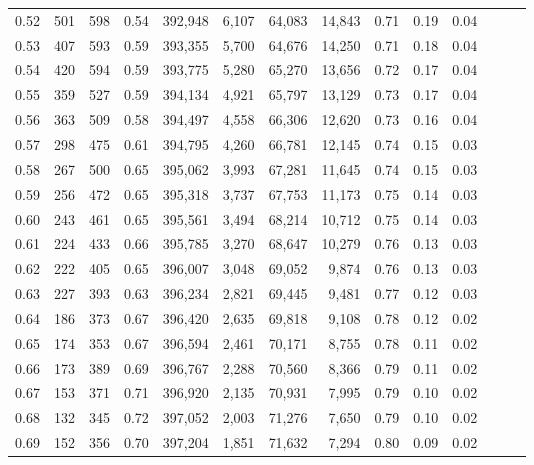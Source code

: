 \begin{tabular}{rrrrrrrrrrrrrr}
0.52 &     501 &    598 &  0.54 &  392,948 &    6,107 &  64,083 &  14,843 &  0.71 &  0.19 &      0.04 \\
0.53 &     407 &    593 &  0.59 &  393,355 &    5,700 &  64,676 &  14,250 &  0.71 &  0.18 &      0.04 \\
0.54 &     420 &    594 &  0.59 &  393,775 &    5,280 &  65,270 &  13,656 &  0.72 &  0.17 &      0.04 \\
0.55 &     359 &    527 &  0.59 &  394,134 &    4,921 &  65,797 &  13,129 &  0.73 &  0.17 &      0.04 \\
0.56 &     363 &    509 &  0.58 &  394,497 &    4,558 &  66,306 &  12,620 &  0.73 &  0.16 &      0.04 \\
0.57 &     298 &    475 &  0.61 &  394,795 &    4,260 &  66,781 &  12,145 &  0.74 &  0.15 &      0.03 \\
0.58 &     267 &    500 &  0.65 &  395,062 &    3,993 &  67,281 &  11,645 &  0.74 &  0.15 &      0.03 \\
0.59 &     256 &    472 &  0.65 &  395,318 &    3,737 &  67,753 &  11,173 &  0.75 &  0.14 &      0.03 \\
0.60 &     243 &    461 &  0.65 &  395,561 &    3,494 &  68,214 &  10,712 &  0.75 &  0.14 &      0.03 \\
0.61 &     224 &    433 &  0.66 &  395,785 &    3,270 &  68,647 &  10,279 &  0.76 &  0.13 &      0.03 \\
0.62 &     222 &    405 &  0.65 &  396,007 &    3,048 &  69,052 &   9,874 &  0.76 &  0.13 &      0.03 \\
0.63 &     227 &    393 &  0.63 &  396,234 &    2,821 &  69,445 &   9,481 &  0.77 &  0.12 &      0.03 \\
0.64 &     186 &    373 &  0.67 &  396,420 &    2,635 &  69,818 &   9,108 &  0.78 &  0.12 &      0.02 \\
0.65 &     174 &    353 &  0.67 &  396,594 &    2,461 &  70,171 &   8,755 &  0.78 &  0.11 &      0.02 \\
0.66 &     173 &    389 &  0.69 &  396,767 &    2,288 &  70,560 &   8,366 &  0.79 &  0.11 &      0.02 \\
0.67 &     153 &    371 &  0.71 &  396,920 &    2,135 &  70,931 &   7,995 &  0.79 &  0.10 &      0.02 \\
0.68 &     132 &    345 &  0.72 &  397,052 &    2,003 &  71,276 &   7,650 &  0.79 &  0.10 &      0.02 \\
0.69 &     152 &    356 &  0.70 &  397,204 &    1,851 &  71,632 &   7,294 &  0.80 &  0.09 &      0.02 \\

\end{tabular}
